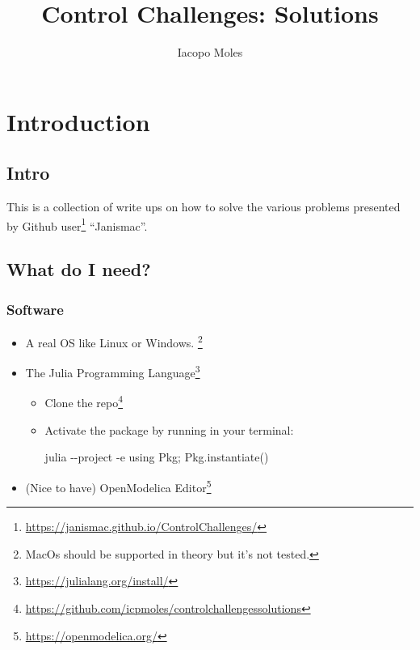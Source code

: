\documentclass[
  a4paper,
  DIV=11,
  numbers=noendperiod]{scrreprt}
\title{Control Challenges: Solutions}
\author{Iacopo Moles}
\date{}
\newenvironment{Shaded}{\begin{snugshade}}{\end{snugshade}}
\newcommand{\AttributeTok}[1]{\textcolor[rgb]{0.40,0.45,0.13}{#1}}
\newcommand{\ExtensionTok}[1]{\textcolor[rgb]{0.00,0.23,0.31}{#1}}
\newcommand{\StringTok}[1]{\textcolor[rgb]{0.13,0.47,0.30}{#1}}
\renewcommand*\contentsname{Table of contents}
\newcommand\contentsname{Table of contents}
\DeclareRobustCommand{\href}[2]{#2\footnote{\url{#1}}}
\begin{document}
\maketitle


\renewcommand*\contentsname{Table of contents}
{
\hypersetup{linkcolor=}
\setcounter{tocdepth}{2}
\tableofcontents
}


\chapter{Introduction}\label{introduction}

\section{Intro}\label{sec-home}

This is a collection of write ups on how to solve the various problems
presented by \href{https://janismac.github.io/ControlChallenges/}{Github
user} ``Janismac''.

\section{What do I need?}\label{what-do-i-need}

\subsection{Software}\label{software}

\begin{itemize}
\item
  A real OS like Linux or Windows. \footnote{MacOs should be supported
    in theory but it's not tested.}
\item
  The \href{https://julialang.org/install/}{Julia Programming Language}

  \begin{itemize}
  \item
    Clone the
    \href{https://github.com/icpmoles/controlchallengessolutions}{repo}
  \item
    Activate the package by running in your terminal:

\begin{Shaded}
\begin{Highlighting}[]
\ExtensionTok{julia} \AttributeTok{{-}{-}project} \AttributeTok{{-}e} \StringTok{\textquotesingle{}using Pkg; Pkg.instantiate()\textquotesingle{}}
\end{Highlighting}
\end{Shaded}
  \end{itemize}
\item
  (Nice to have) \href{https://openmodelica.org/}{OpenModelica Editor}
\end{itemize}
\end{document}
